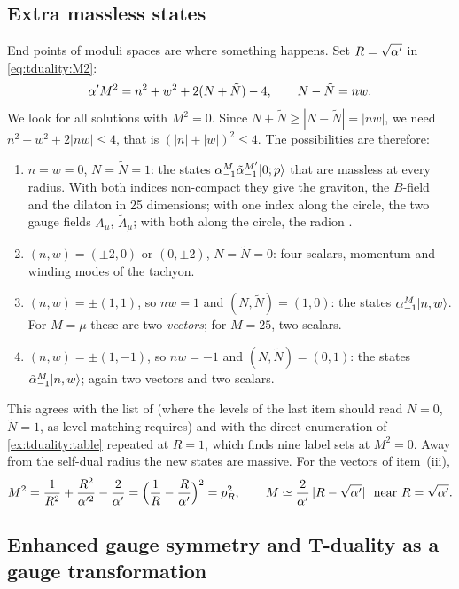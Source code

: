 \subsection{Extra massless states}

End points of moduli spaces are where something happens. Set $R=\sqrt{\alpha'}$ in
\eqref{eq:tduality:M2}:
\begin{equation}\label{eq:tduality:M2sd}
  \alpha' M^2=n^2+w^2+2(N+\tilde N)-4,\qquad N-\tilde N=nw .
\end{equation}
We look for all solutions with $M^2=0$. Since $N+\tilde N\ge|N-\tilde N|=|nw|$, we need
$n^2+w^2+2|nw|\le4$, that is $(|n|+|w|)^2\le4$. The possibilities are therefore:
\begin{enumerate}[leftmargin=*,label=(\roman*)]
\item $n=w=0$, $N=\tilde N=1$: the states
 $\alpha^M_{-1}\tilde\alpha^{M'}_{-1}|0;p\rangle$ that are massless at every radius. With both indices
 non-compact they give the graviton, the $B$-field and the dilaton in 25 dimensions; with one
 index along the circle, the two gauge fields $A_\mu$, $\tilde A_\mu$; with both along the
 circle, the radion .
\item $(n,w)=(\pm2,0)$ or $(0,\pm2)$, $N=\tilde N=0$: four scalars, momentum and winding modes of
 the tachyon.
\item $(n,w)=\pm(1,1)$, so $nw=1$ and $(N,\tilde N)=(1,0)$: the states $\alpha^M_{-1}|n,w\rangle$. For
 $M=\mu$ these are two \emph{vectors}; for $M=25$, two scalars.
\item $(n,w)=\pm(1,-1)$, so $nw=-1$ and $(N,\tilde N)=(0,1)$: the states
 $\tilde\alpha^M_{-1}|n,w\rangle$; again two vectors and two scalars.
\end{enumerate}
This agrees with the list of  (where the levels of the
last item should read $N=0$, $\tilde N=1$, as level matching requires) and with the direct
enumeration of \cref{ex:tduality:table} repeated at $R=1$, which finds nine label sets at
$M^2=0$. Away from the self-dual radius the new states are massive. For the vectors of
item~(iii),
\begin{equation}\label{eq:tduality:W}
  M^2=\frac1{R^2}+\frac{R^2}{\alpha'^2}-\frac2{\alpha'}=\Big(\frac1R-\frac R{\alpha'}\Big)^2=p_R^2,
  \qquad M\simeq\frac{2}{\alpha'}\,|R-\sqrt{\alpha'}|\ \text{ near }R=\sqrt{\alpha'}.
\end{equation}

\subsection{Enhanced gauge symmetry and T-duality as a gauge transformation}

